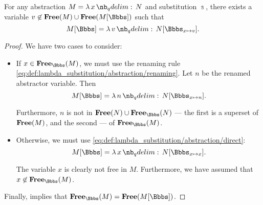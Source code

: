 \begin{proposition}\label{thm:lambda_substitution_single_rule}
  For any abstraction \( M = \qabs x N \) and substitution \( \Bbbs \), there exists a variable \( v \not\in \op*{Free}(M) \cup \op*{Free}(M[\Bbbs]) \) such that
  \begin{equation}\label{eq:thm:lambda_substitution_single_rule}
    M[\Bbbs] = \qabs v N[\Bbbs_{x \mapsto v}].
  \end{equation}
\end{proposition}
\begin{proof}
  We have two cases to consider:
  \begin{itemize}
    \item If \( x \in \op*{Free}_\Bbbs(M) \), we must use the renaming rule \eqref{eq:def:lambda_substitution/abstraction/renaming}. Let \( n \) be the renamed abstractor variable. Then
    \begin{equation*}
      M[\Bbbs] = \qabs n N[\Bbbs_{x \mapsto n}].
    \end{equation*}

    Furthermore, \( n \) is not in \( \op*{Free}(N) \cup \op*{Free}_\Bbbs(N) \) --- the first is a superset of \( \op*{Free}(M) \), and the second --- of \( \op*{Free}_\Bbbs(M) \).

    \item Otherwise, we must use \eqref{eq:def:lambda_substitution/abstraction/direct}:
    \begin{equation*}
      M[\Bbbs] = \qabs x N[\Bbbs_{x \mapsto x}].
    \end{equation*}

    The variable \( x \) is clearly not free in \( M \). Furthermore, we have assumed that \( x \not\in \op*{Free}_\Bbbs(M) \).
  \end{itemize}

  Finally,  implies that \( \op*{Free}_\Bbbs(M) = \op*{Free}(M[\Bbbs]) \).
\end{proof}
